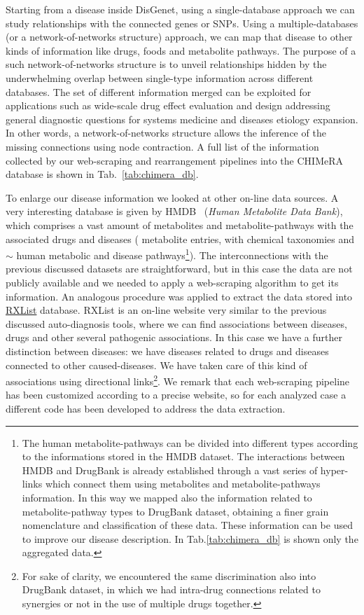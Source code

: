 \documentclass{standalone}
\begin{document}
Starting from a disease inside DisGenet, using a single-database approach we can study  relationships with the connected genes or SNPs.
Using a multiple-databases (or a network-of-networks structure) approach, we can map that disease to other kinds of information like drugs, foods and metabolite pathways.
The purpose of a such network-of-networks structure is to unveil relationships hidden by the underwhelming overlap between single-type information across different databases.
The set of different information merged can be exploited for applications such as wide-scale drug effect evaluation and design addressing general diagnostic questions for systems medicine and diseases etiology expansion.
In other words, a network-of-networks structure allows the inference of the missing connections using node contraction.
A full list of the information collected by our \textsf{web-scraping} and rearrangement pipelines into the \textsf{CHIMeRA} database is shown in Tab.~\ref{tab:chimera_db}.

To enlarge our disease information we looked at other on-line data sources.
A very interesting database is given by HMDB~\cite{HMDB} (\emph{Human Metabolite Data Bank}), which comprises a vast amount of metabolites and metabolite-pathways with the associated drugs and diseases ( metabolite entries, with chemical taxonomies and $\sim$ human metabolic and disease pathways\footnote{
  The human metabolite-pathways can be divided into different types according to the informations stored in the HMDB dataset.
  The interactions between HMDB and DrugBank is already established through a vast series of hyper-links which connect them using metabolites and metabolite-pathways information.
  In this way we mapped also the information related to metabolite-pathway types to DrugBank dataset, obtaining a finer grain nomenclature and classification of these data.
  These information can be used to improve our disease description.
  In Tab.\ref{tab:chimera_db} is shown only the aggregated data.
}).
The interconnections with the previous discussed datasets are straightforward, but in this case the data are not publicly available and we needed to apply a \textsf{web-scraping} algorithm to get its information.
An analogous procedure was applied to extract the data stored into \href{https://www.rxlist.com/script/main/hp.asp}{RXList} database.
RXList is an on-line website very similar to the previous discussed auto-diagnosis tools, where we can find associations between diseases, drugs and other several pathogenic associations.
In this case we have a further distinction between diseases: we have diseases related to drugs and diseases connected to other caused-diseases.
We have taken care of this kind of associations using directional links\footnote{
  For sake of clarity, we encountered the same discrimination also into DrugBank dataset, in which we had intra-drug connections related to synergies or not in the use of multiple drugs together.
}.
We remark that each \textsf{web-scraping} pipeline has been customized according to a precise website, so for each analyzed case a different code has been developed to address the data extraction.
\end{document}
